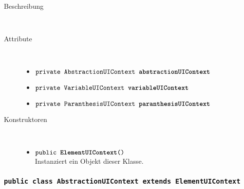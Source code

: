 \begin{description}
\item[Beschreibung] \hfill \\ 
\item[Attribute] \hfill \\
	\vspace{-.8cm}
	\begin{itemize}	
		\item $\texttt{private AbstractionUIContext \textbf{abstractionUIContext}}$ \\ 		
		\item $\texttt{private VariableUIContext \textbf{variableUIContext}}$ \\ 
		\item $\texttt{private ParanthesisUIContext \textbf{paranthesisUIContext}}$ \\ 
		\end{itemize}
	
\item[Konstruktoren] \hfill \\
	\vspace{-.8cm}
	\begin{itemize}
		\item $\texttt{public \textbf{ElementUIContext}()}$ \\ Instanziert ein Objekt dieser Klasse.

	
		\end{itemize}
	\end{description}
	
	
	
	\subsubsection{\normalfont \texttt{public class \textbf{AbstractionUIContext} extends ElementUIContext}}

